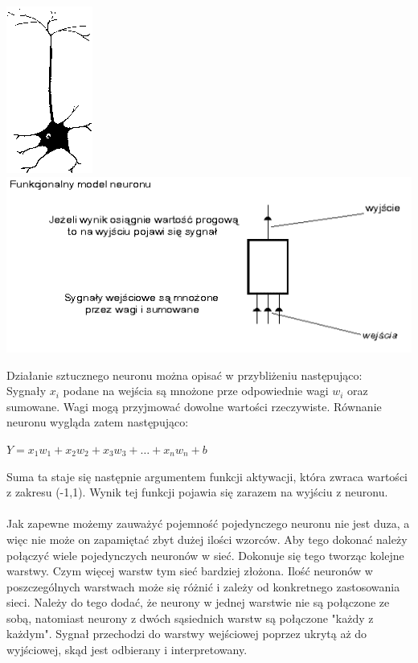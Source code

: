 \documentclass[11pt,a4paper]{article}
\begin{document}
\vspace*{1cm}
\hspace*{1cm}
\includegraphics[scale=0.7]{neuron}
\hspace*{1cm}
\includegraphics[scale=0.7]{neuron2}
\hspace*{1cm}
\vspace*{1cm}

Działanie sztucznego neuronu można opisać w przybliżeniu następująco:\\
Sygnały $x_{i}$ podane na wejścia są mnożone prze odpowiednie wagi $w_{i}$ oraz sumowane.
 Wagi mogą przyjmować dowolne wartości rzeczywiste. Równanie neuronu wygląda zatem następująco:
\begin{center}
$Y = x_{1}w_{1} + x_{2}w_{2} + x_{3}w_{3} + … + x_{n}w_{n} + b$\\
\end{center}
Suma ta staje się następnie argumentem funkcji aktywacji, która zwraca wartości z zakresu 
(-1,1). Wynik tej funkcji pojawia się zarazem na wyjściu z neuronu.\\
\\
Jak zapewne możemy zauważyć pojemność pojedynczego neuronu nie jest duza, a więc nie może on zapamiętać 
zbyt dużej ilości wzorców. Aby tego dokonać należy połączyć wiele pojedynczych neuronów w sieć. 
Dokonuje się tego tworząc kolejne warstwy. Czym więcej warstw tym sieć bardziej złożona.
 Ilość neuronów w poszczególnych warstwach może się różnić i zależy od konkretnego zastosowania sieci.
 Należy do tego dodać, że neurony w jednej warstwie nie są połączone ze sobą, natomiast neurony z dwóch
 sąsiednich warstw są połączone "każdy z każdym". Sygnał przechodzi do warstwy wejściowej poprzez ukrytą 
aż do wyjściowej, skąd jest odbierany i interpretowany.
\end{document}
